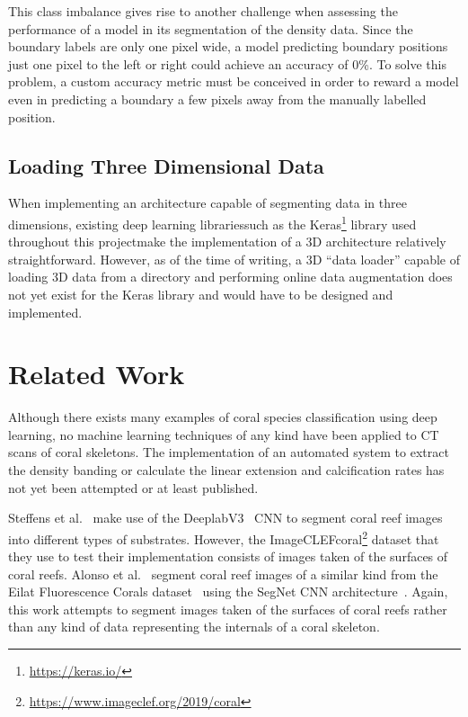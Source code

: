 This class imbalance gives rise to another challenge when assessing the performance of a model in its segmentation of the density data. Since the boundary labels are only one pixel wide, a model predicting boundary positions just one pixel to the left or right could achieve an accuracy of 0\%. To solve this problem, a custom accuracy metric must be conceived in order to reward a model even in predicting a boundary a few pixels away from the manually labelled position.

\subsection{Loading Three Dimensional Data}

When implementing an architecture capable of segmenting data in three dimensions, existing deep learning libraries\textemdash such as the Keras\footnote{\url{https://keras.io/}} library used throughout this project\textemdash make the implementation of a 3D architecture relatively straightforward. However, as of the time of writing, a 3D ``data loader'' capable of loading 3D data from a directory and performing online data augmentation does not yet exist for the Keras library and would have to be designed and implemented.

\section{Related Work}

Although there exists many examples of coral species classification using deep learning, no machine learning techniques of any kind have been applied to CT scans of coral skeletons. The implementation of an automated system to extract the density banding or calculate the linear extension and calcification rates has not yet been attempted or at least published.

Steffens et al.~\cite{steff} make use of the DeeplabV3~\cite{deeplab} CNN to segment coral reef images into different types of substrates. However, the ImageCLEFcoral\footnote{\url{https://www.imageclef.org/2019/coral}} dataset that they use to test their implementation consists of images taken of the surfaces of coral reefs. Alonso et al.~\cite{alonso} segment coral reef images of a similar kind from the Eilat Fluorescence Corals dataset~\cite{eilat} using the SegNet CNN architecture~\cite{segnet}. Again, this work attempts to segment images taken of the surfaces of coral reefs rather than any kind of data representing the internals of a coral skeleton.


